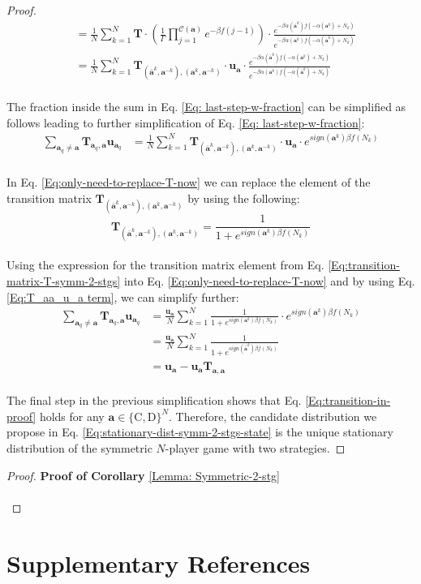\documentclass[11pt]{article}
\theoremstyle{plainCl1}
\theoremstyle{plainCl2}
\newcommand{\abf}{\mathbf{a}}
\newcommand{\T}{\mathbf{T}}
\newcommand{\ubf}{\mathbf{u}}
\newcommand{\C}{\mathrm{C}}
\newcommand{\D}{\mathrm{D}}
\begin{document}
\begin{proof}
\begin{align}
&= \frac{1}{N} \sum_{k=1}^N  \T \cdot \left( \frac{1}{\Gamma} \prod_{j=1}^{\mathcal{C}(\abf)} e^{-\beta f(j-1)}\right) \cdot \frac{e^{-\beta \alpha(\bar{\abf}^k)f(-\alpha(\abf^k)+ N_k)}}{e^{-\beta \alpha(\abf^k)f(-\alpha(\bar{\abf}^k) +N_k)}} \\[10pt]
&= \frac{1}{N} \sum_{k=1}^N  \T_{(\bar{\abf}^k, \abf^{-k}),(\abf^k, \abf^{-k})} \cdot \ubf_\abf \cdot \frac{e^{-\beta \alpha(\bar{\abf}^k)f(-\alpha(\abf^k)+ N_k)}}{e^{-\beta \alpha(\abf^k)f(-\alpha(\bar{\abf}^k) +N_k)}} \label{Eq: last-step-w-fraction} 
\end{align}
\\ \noindent The fraction inside the sum in  Eq. \ref{Eq: last-step-w-fraction} can be simplified as follows leading to further simplification of Eq. \ref{Eq: last-step-w-fraction}:
\begin{align}
\sum_{\abf_q \neq \abf} \T_{\abf_q, \abf} \ubf_{\abf_q} &= \frac{1}{N} \sum_{k=1}^N  \T_{(\bar{\abf}^k, \abf^{-k}),(\abf^k, \abf^{-k})} \cdot \ubf_\abf \cdot e^{sign(\abf^k) \beta f(N_k)} 
\label{Eq:only-need-to-replace-T-now}
\end{align}
\\ \noindent In Eq. \ref{Eq:only-need-to-replace-T-now} we can replace the element of the transition matrix $\T_{(\bar{\abf}^k, \abf^{-k}),(\abf^k, \abf^{-k})}$ by using the following: 
\begin{equation}
\T_{(\bar{\abf}^k, \abf^{-k}),(\abf^k, \abf^{-k})} = \frac{1}{1 + \displaystyle e^{\mathit{sign}(\abf^k) \beta f(N_k)}} 
\label{Eq:transition-matrix-T-symm-2-stgs}
\end{equation}
\\ \noindent Using the expression for the transition matrix element from Eq. \ref{Eq:transition-matrix-T-symm-2-stgs} into Eq. \ref{Eq:only-need-to-replace-T-now} and by using Eq. \ref{Eq:T_aa_u_a term}, we can simplify further: 
\begin{align}
\sum_{\abf_q \neq \abf} \T_{\abf_q, \abf} \ubf_{\abf_q} &= \frac{\ubf_\abf}{N} \sum_{k=1}^N \frac{1}{1 + \displaystyle e^{\mathit{sign}(\abf^k) \beta f(N_k)}} \cdot  e^{sign(\abf^k) \beta f(N_k)} \\[10pt]
&= \frac{\ubf_\abf}{N} \sum_{k=1}^N \frac{1}{1 + \displaystyle e^{\mathit{sign}(\bar{\abf}^k) \beta f(N_k)}}  \\[10pt]
&= \ubf_\abf - \ubf_\abf \T_{\abf,\abf}
\end{align}
\\ \noindent The final step in the previous simplification shows that Eq. \ref{Eq:transition-in-proof} holds for any $\abf \in \{\C,\D\}^N$. Therefore, the candidate distribution we propose in Eq. \ref{Eq:stationary-dist-symm-2-stgs-state} is the unique stationary distribution of the symmetric $N$-player game with two strategies.
\end{proof}

 
\begin{proof}
\textbf{Proof of Corollary} \ref{Lemma: Symmetric-2-stg} \\ \\

\end{proof}
\newpage
\section*{Supplementary References}


\end{document}
